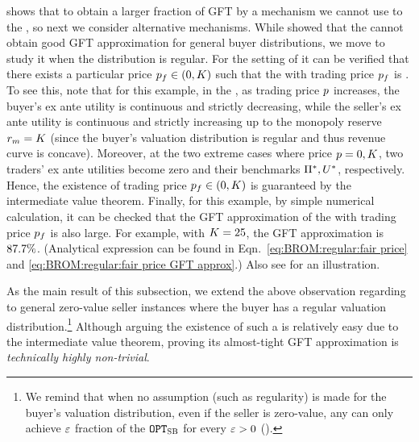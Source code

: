  shows that to obtain a larger fraction of GFT by a {\ksfair} mechanism we cannot use to the {\BiasedRandomOffer}, so next we consider alternative mechanisms. While  showed that the {\FixPrice} cannot obtain good GFT approximation for general buyer distributions, we move to study it when the distribution is regular. For the setting of  it can be verified that there exists a particular price $p_f\in(0, K)$ such that the {\FixPrice} with trading price $p_f$ is {\ksfair}. To see this, note that for this example, in the {\FixPrice}, as trading price $p$ increases, the buyer's ex ante utility is continuous and strictly decreasing, while the seller's ex ante utility is continuous and strictly increasing up to the monopoly reserve $r_m = K$ (since the buyer's valuation distribution is regular and thus revenue curve is concave). Moreover, at the two extreme cases where price $p = 0, K$, two traders' ex ante utilities become zero and their benchmarks $\Pi^*, U^*$, respectively. Hence, the existence of {\ksfair} trading price $p_f\in(0, K)$ is guaranteed by the intermediate value theorem. Finally, for this example, by simple numerical calculation, it can be checked that the GFT approximation of the {\FixPrice} with trading price $p_f$ is also large. For example, with $K = 25$, the GFT approximation is ${87.7\%}$. (Analytical expression can be found in Eqn.~\eqref{eq:BROM:regular:fair price} and \eqref{eq:BROM:regular:fair price GFT approx}.) 
Also see  for an illustration.

As the main result of this subsection, we extend the above observation regarding  to general zero-value seller instances where the buyer has a regular valuation distribution.\footnote{{We remind that when no assumption (such as regularity) is made for the buyer's valuation distribution, even if the seller is zero-value, any {\ksfair} {\FixPrice} can only achieve $\varepsilon$ fraction of the {\SecondBest} $\texttt{OPT}_{\textsc{SB}}$ for every $\varepsilon > 0$ ().}} Although arguing the existence of such a {\ksfair} {\FixPrice} is relatively easy due to the intermediate value theorem, proving its almost-tight GFT approximation is \emph{technically highly non-trivial}. 

